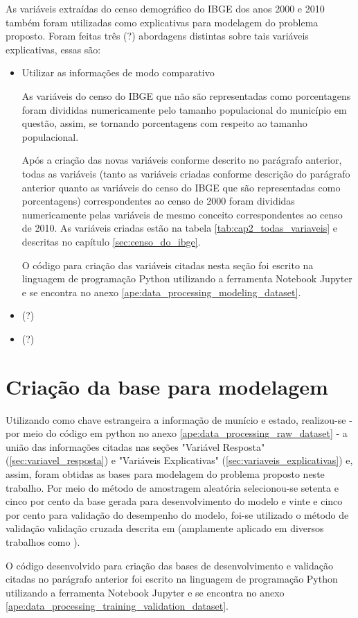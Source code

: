 As variáveis extraídas do censo demográfico do IBGE dos anos 2000 e 2010 também foram utilizadas como explicativas para modelagem do problema proposto. Foram feitas três (?) abordagens distintas sobre tais variáveis explicativas, essas são:

\begin{itemize}
\item Utilizar as informações de modo comparativo

As variáveis do censo do IBGE que não são representadas como porcentagens foram divididas numericamente pelo tamanho populacional do município em questão, assim, se tornando porcentagens com respeito ao tamanho populacional.

Após a criação das novas variáveis conforme descrito no parágrafo anterior, todas as variáveis (tanto as variáveis criadas conforme descrição do parágrafo anterior quanto as variáveis do censo do IBGE que são representadas como porcentagens) correspondentes ao censo de 2000 foram divididas numericamente pelas variáveis de mesmo conceito correspondentes ao censo de 2010. As variáveis criadas estão na tabela \ref{tab:cap2_todas_variaveis} e descritas no capítulo \ref{sec:censo_do_ibge}.

O código para criação das variáveis citadas nesta seção foi escrito na linguagem de programação Python utilizando a ferramenta Notebook Jupyter e se encontra no anexo \ref{ape:data_processing_modeling_dataset}.

\item (?)
\item (?)

\end{itemize}

\section{Criação da base para modelagem}
\label{sec:criacao_da_base_para_modelagem}

Utilizando como chave estrangeira a informação de munício e estado, realizou-se - por meio do código em python no anexo \ref{ape:data_processing_raw_dataset} - a união das informações citadas nas seções "Variável Resposta" (\ref{sec:variavel_resposta}) e "Variáveis Explicativas" (\ref{sec:variaveis_explicativas}) e, assim, foram obtidas as bases para modelagem do problema proposto neste trabalho. Por meio do método de amostragem aleatória selecionou-se setenta e cinco por cento da base gerada para desenvolvimento do modelo e vinte e cinco por cento para validação do desempenho do modelo, foi-se utilizado o método de validação validação cruzada descrita em \citet{Kohavi1995} (amplamente aplicado em diversos trabalhos como \citet{Wesllen2017:MSc}).

O código desenvolvido para criação das bases de desenvolvimento e validação citadas no parágrafo anterior foi escrito na linguagem de programação Python utilizando a ferramenta Notebook Jupyter e se encontra no anexo \ref{ape:data_processing_training_validation_dataset}.


